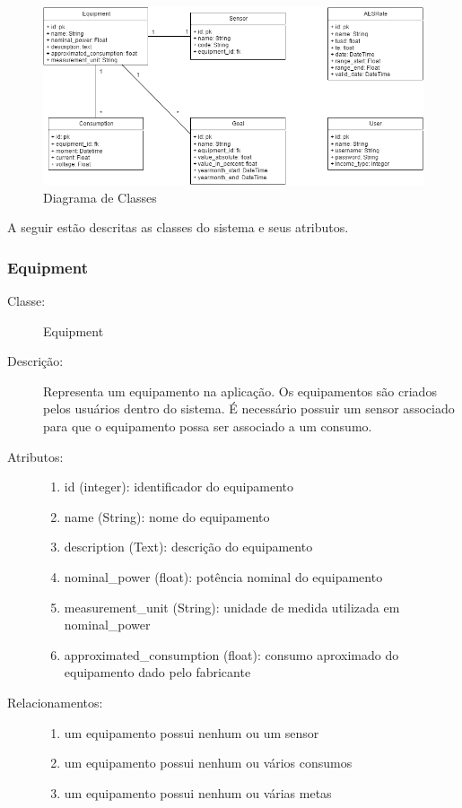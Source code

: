 \begin{figure}[H]
\begin{center}
\includegraphics[width=1\textwidth]{figuras/diagrama_classes.png}
\caption{\label{fig:diagrama-classes} Diagrama de Classes}
\end{center}
\end{figure}

A seguir estão descritas as classes do sistema e seus atributos.

\subsubsection{Equipment}
\begin{description}
	\item[Classe:] Equipment
	\item[Descrição:] Representa um equipamento na aplicação. Os equipamentos são criados pelos usuários dentro do sistema. É necessário possuir um sensor associado para que o equipamento possa ser associado a um consumo.
	\item[Atributos:] \hfill
		\begin{enumerate}
		  \item id (integer): identificador do equipamento
		  \item name (String): nome do equipamento
		  \item description (Text): descrição do equipamento 
		  \item nominal\_power (float): potência nominal do equipamento 
		  \item measurement\_unit (String): unidade de medida utilizada em nominal\_power
		  \item approximated\_consumption (float): consumo aproximado do equipamento dado pelo fabricante 
		\end{enumerate}
	\item[Relacionamentos:] \hfill
		\begin{enumerate}
			\item um equipamento possui nenhum ou um sensor
			\item um equipamento possui nenhum ou vários consumos
			\item um equipamento possui nenhum ou várias metas
		\end{enumerate}
\end{description} 
%
